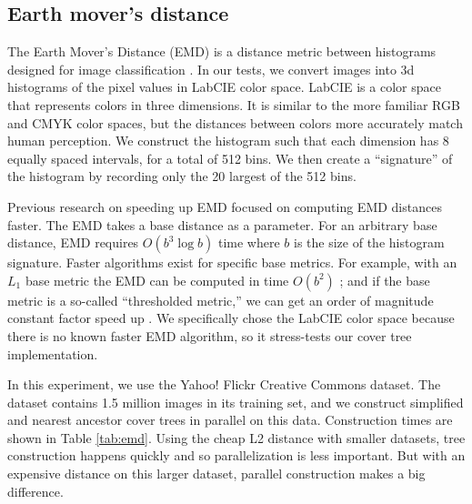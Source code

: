 \documentclass[thesis.tex]{subfiles}
\begin{document}
\subsection{Earth mover's distance}

The Earth Mover's Distance (EMD) is a distance metric between histograms designed for image classification \citep{Rubner1998}.
In our tests, we convert images into 3d histograms of the pixel values in LabCIE color space.
LabCIE is a color space that represents colors in three dimensions.
It is similar to the more familiar RGB and CMYK color spaces,
but the distances between colors more accurately match human perception.
We construct the histogram such that each dimension has 8 equally spaced intervals, for a total of 512 bins.
We then create a ``signature'' of the histogram by recording only the 20 largest of the 512 bins.

Previous research on speeding up EMD focused on computing EMD distances faster.
The EMD takes a base distance as a parameter.
For an arbitrary base distance, EMD requires $O(b^3\log b)$ time where $b$ is the size of the histogram signature.
Faster algorithms exist for specific base metrics.
For example, with an $L_1$ base metric the EMD can be computed in time $O(b^2)$ \citep{Ling07}; and if the base metric is a so-called ``thresholded metric,'' we can get an order of magnitude constant factor speed up \citep{Pele2009}.
We specifically chose the LabCIE color space because there is no known faster EMD algorithm,
so it stress-tests our cover tree implementation.

In this experiment, we use the Yahoo! Flickr Creative Commons dataset.
The dataset contains 1.5 million images in its training set,
and we construct simplified and nearest ancestor cover trees in parallel on this data.
Construction times are shown in Table \ref{tab:emd}.
Using the cheap L2 distance with smaller datasets, tree construction happens quickly and so parallelization is less important.
But with an expensive distance on this larger dataset, parallel construction makes a big difference.
\end{document}
